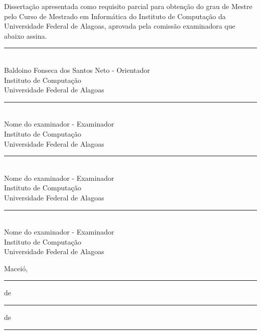 \begin{titlepage}
    \vspace{1.4cm}

                \noindent Dissertação apresentada como requisito parcial para obtenção do grau de Mestre pelo Curso de Mestrado em Informática do Instituto de Computação da Universidade Federal de Alagoas, aprovada pela comissão examinadora que abaixo assina.
        \vspace{1.4cm}

        \begin{center}
            \rule{10cm}{0.4pt}\\
            Baldoino Fonseca dos Santos Neto - Orientador\\ 
            Instituto de Computação\\ 
            Universidade Federal de Alagoas\\[1.5cm]

            \rule{10cm}{0.4pt}\\
            Nome do examinador - Examinador\\ 
            Instituto de Computação\\ 
            Universidade Federal de Alagoas\\[1.5cm]

            \rule{10cm}{0.4pt}\\
            Nome do examinador - Examinador\\ 
            Instituto de Computação\\ 
            Universidade Federal de Alagoas\\[1.5cm]

            \rule{10cm}{0.4pt}\\
            Nome do examinador - Examinador\\ 
            Instituto de Computação\\ 
            Universidade Federal de Alagoas\\[1.5cm]

            \vfill

            Maceió, \rule{0.8cm}{0.4pt} de \rule{3.5cm}{0.4pt} de \rule{1.5cm}{0.4pt}

        \end{center}
\end{titlepage} 